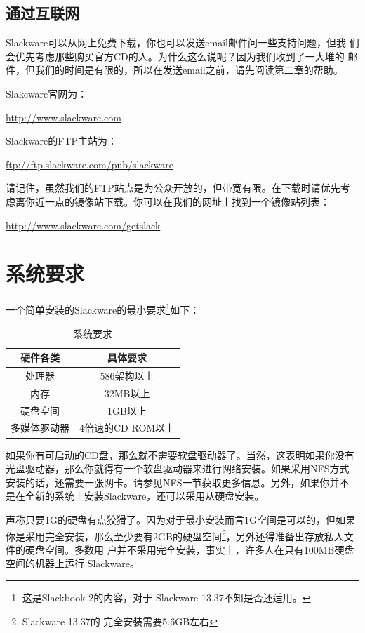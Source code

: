 \subsection{通过互联网}
\label{sec:installation:gettingSlackware:internet}

Slackware可以从网上免费下载，你也可以发送email邮件问一些支持问题，但我
们会优先考虑那些购买官方CD的人。为什么这么说呢？因为我们收到了一大堆的
邮件，但我们的时间是有限的，所以在发送email之前，请先阅读第二章的帮助。

Slakcware官网为：

\url{http://www.slackware.com}

Slackware的FTP主站为： 

\url{ftp://ftp.slackware.com/pub/slackware}

请记住，虽然我们的FTP站点是为公众开放的，但带宽有限。在下载时请优先考
虑离你近一点的镜像站下载。你可以在我们的网址上找到一个镜像站列表：

\url{http://www.slackware.com/getslack}

\section{系统要求}
\label{sec:installation:systemRequirements}

一个简单安装的Slackware的最小要求\footnote{这是Slackbook 2的内容，对于
  Slackware 13.37不知是否还适用。}如下：

\begin{table}[htpb]
  \centering
  \begin{tabular}{c|c}
    \hline \hline 
    硬件各类 & 具体要求 \\ \hline
    处理器 & 586架构以上 \\
    内存 & 32MB以上 \\
    硬盘空间 & 1GB以上 \\
    多媒体驱动器 & 4倍速的CD-ROM以上 \\
    \hline\hline
  \end{tabular}
  \caption{系统要求}
  \label{tab:systemRequirements}
\end{table}
如果你有可启动的CD盘，那么就不需要软盘驱动器了。当然，这表明如果你没有
光盘驱动器，那么你就得有一个软盘驱动器来进行网络安装。如果采用NFS方式
安装的话，还需要一张网卡。请参见NFS一节获取更多信息。另外，如果你并不
是在全新的系统上安装Slackware，还可以采用从硬盘安装。

声称只要1G的硬盘有点狡猾了。因为对于最小安装而言1G空间是可以的，但如果
你是采用完全安装，那么至少要有2GB的硬盘空间\footnote{Slackware 13.37的
  完全安装需要5.6GB左右}，另外还得准备出存放私人文件的硬盘空间。多数用
户并不采用完全安装，事实上，许多人在只有100MB硬盘空间的机器上运行
Slackware。

